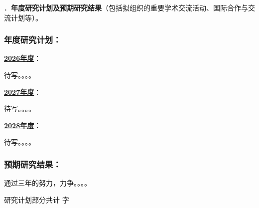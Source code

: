{\sihao \color{MsBlue} ．{\bfseries 年度研究计划及预期研究结果}（包括拟组织的重要学术交流活动、国际合作与交流计划等）。}

\subsubsection{{\bfseries 年度研究计划：}}

\uline{\bfseries 2026年度}：

待写。。。。

\uline{\bfseries 2027年度}：

待写。。。。

\uline{\bfseries 2028年度}：

待写。。。。


\subsubsection{{\bfseries 预期研究结果：}}

通过三年的努力，力争。。。。


\ifhandout
\else
\begin{center}
{\larger[2]\color{red}  研究计划部分共计 \wordcount 字 }
\end{center}
\fi


\vskip 5mm
